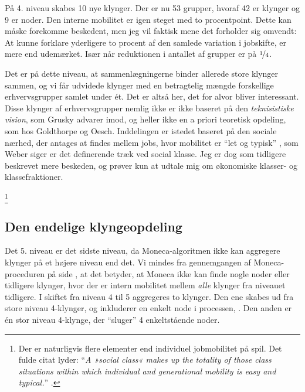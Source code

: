 På 4. niveau skabes 10 nye klynger. Der er nu 53 grupper, hvoraf 42 er klynger og 9 er noder. Den interne mobilitet er igen steget med to procentpoint. Dette kan måske forekomme beskedent, men jeg vil faktisk mene det forholder sig omvendt: At kunne forklare yderligere to procent af den samlede variation i jobskifte, er mere end udemærket. Især når reduktionen i antallet af grupper er på $\nicefrac{1}{4}$. 


Det er på dette niveau, at sammenlægningerne binder allerede store klynger sammen, og vi får udvidede klynger med en betragtelig mængde forskellige erhvervsgrupper samlet under ét. Det er altså her, det for alvor bliver interessant. 
Disse klynger af erhvervsgrupper nemlig ikke er ikke baseret på den \emph{teknisistiske vision}, som Grusky advarer imod, og heller ikke en a priori teoretisk opdeling, som hos Goldthorpe og Oesch. Inddelingen er istedet baseret på den sociale nærhed, der antages at findes mellem jobs, hvor mobilitet er “let og typisk” , som Weber siger er det definerende træk ved social klasse. Jeg er dog som tidligere beskrevet mere beskeden, og prøver kun at udtale mig om økonomiske klasser- og klassefraktioner.  %

%
\footnote{Der er naturligvis flere elementer end individuel jobmobilitet på spil. Det fulde citat lyder: “\textit{A »social class« makes up the totality of those class situations within which individual and generational mobility is easy and typical.}” \parencite[302]{Weber1978}. }%
%

\subsection{Den endelige klyngeopdeling \label{delanalyse1_endelige mobilitetskort}}

Det 5. niveau er det sidste niveau, da Moneca-algoritmen ikke kan aggregere klynger på et højere niveau end det. Vi mindes fra gennemgangen af Moneca-proceduren på side  \pageref{metode_monecastepbystep}, at det betyder, at Moneca ikke kan finde nogle noder eller tidligere klynger, hvor der er intern mobilitet mellem  \emph{alle} klynger fra niveauet tidligere. %
I skiftet fra niveau 4 til 5 aggregeres to klynger. Den ene skabes ud fra store niveau 4-klynger, og inkluderer en enkelt node i processen, . Den anden er én stor niveau 4-klynge, der “sluger” 4 enkeltstående noder. 

